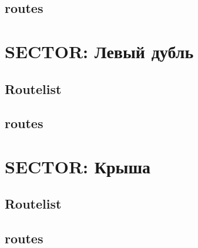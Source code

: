 \documentclass[8pt, a4paper,notitlepage,openany]{report}
\begin{document}
\section*{routes}


\chapter{SECTOR: Левый дубль}
\section*{Routelist}

\newpage
\section*{routes}



\chapter{SECTOR: Крыша}
\section*{Routelist}

\newpage
\section*{routes}





 
\end{document}
